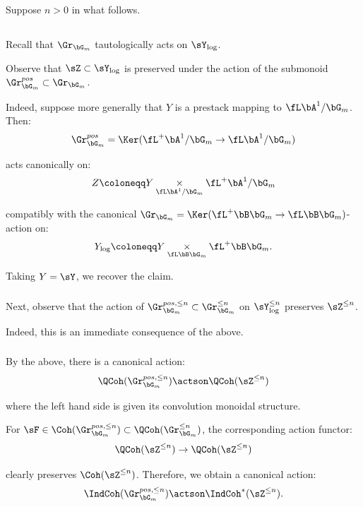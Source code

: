 Suppose $n>0$ in what follows.

\subsection{}

Recall that $\Gr_{\bG_m}$ tautologically acts on $\sY_{\log}$.

Observe that $\sZ \subset \sY_{\log}$ is preserved
under the action of the submonoid
$\Gr_{\bG_m}^{pos} \subset \Gr_{\bG_m}$.

Indeed, suppose more generally that $Y$ is a prestack
mapping to $\fL \bA^1/\bG_m$. Then:
%
\[
\Gr_{\bG_m}^{pos} = \Ker(\fL^+ \bA^1/\bG_m \to \fL \bA^1/\bG_m)
\]

 acts canonically on:
%
\[
Z \coloneqq Y \underset{\fL \bA^1/\bG_m}{\times} \fL^+ \bA^1/\bG_m
\]

 compatibly with the canonical $\Gr_{\bG_m} =
\Ker(\fL^+\bB \bG_m \to \fL \bB \bG_m)$-action on:
%
\[
Y_{\log} \coloneqq Y \underset{\fL\bB\bG_m}{\times} \fL^+ \bB \bG_m.
\]

Taking $Y = \sY$, we recover the claim.

\subsubsection{}

Next, observe that the action of
$\Gr_{\bG_m}^{pos,\leq n} \subset \Gr_{\bG_m}^{\leq n}$
on $\sY_{\log}^{\leq n}$ preserves $\sZ^{\leq n}$.

Indeed, this is an immediate consequence of the above.

\subsubsection{}

By the above, there is a canonical action:
%
\[
\QCoh(\Gr_{\bG_m}^{pos,\leq n}) \actson \QCoh(\sZ^{\leq n})
\]

 where the left hand side is given its convolution monoidal
structure.

For $\sF \in \Coh(\Gr_{\bG_m}^{pos,\leq n}) \subset \QCoh(\Gr_{\bG_m}^{\leq n})$,
the corresponding action functor:
%
\[
\QCoh(\sZ^{\leq n}) \to \QCoh(\sZ^{\leq n})
\]

 clearly preserves $\Coh(\sZ^{\leq n})$. Therefore, we obtain
a canonical action:
%
\[
\IndCoh(\Gr_{\bG_m}^{pos,\leq n}) \actson \IndCoh^*(\sZ^{\leq n}).
\]

\subsubsection{}

